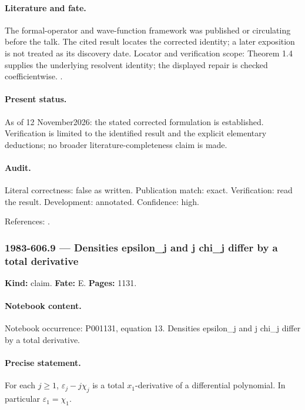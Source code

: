 \paragraph{Literature and fate.} The formal-operator and wave-function framework was published or circulating before the talk. The cited result locates the corrected identity; a later exposition is not treated as its discovery date. Locator and verification scope: Theorem 1.4 supplies the underlying resolvent identity; the displayed repair is checked coefficientwise. \cite{cherednik1978differential}.

\paragraph{Present status.} As of 12 November2026: the stated corrected formulation is established. Verification is limited to the identified result and the explicit elementary deductions; no broader literature-completeness claim is made.

\paragraph{Audit.} Literal correctness: false as written. Publication match: exact. Verification: read the result. Development: annotated. Confidence: high.

\noindent References: \citep{cherednik1978differential}.\par

\subsubsection{1983-606.9 --- Densities epsilon\_j and j chi\_j differ by a total derivative}

\label{item:1983-606.9}

\noindent\textbf{Kind:} claim. \textbf{Fate:} E. \textbf{Pages:} 1131.\par

\paragraph{Notebook content.} Notebook occurrence: P001131, equation 13. Densities epsilon_j and j chi_j differ by a total derivative.

\paragraph{Precise statement.} For each \(j\ge1\), \(\varepsilon_j-j\chi_j\) is a total \(x_1\)-derivative of a differential polynomial. In particular \(\varepsilon_1=\chi_1\).

